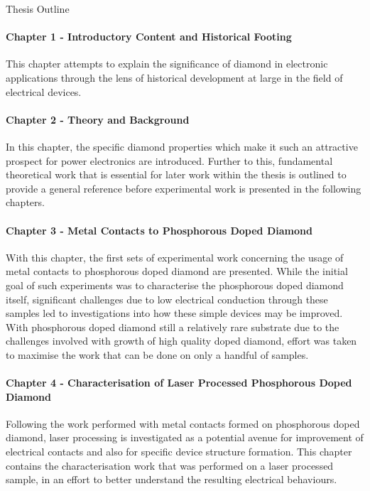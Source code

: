 \begin{refsection}
\begin{introduction}
\begin{section}{Thesis Outline}
{\paragraph{Chapter 1 - Introductory Content and Historical Footing}
This chapter attempts to explain the significance of diamond in electronic applications through the lens of historical development at large in the field of electrical devices. 

\paragraph{Chapter 2 - Theory and Background}
In this chapter, the specific diamond properties which make it such an attractive prospect for power electronics are introduced. Further to this, fundamental theoretical work that is essential for later work within the thesis is outlined to provide a general reference before experimental work is presented in the following chapters.

\paragraph{Chapter 3 - Metal Contacts to Phosphorous Doped Diamond}
With this chapter, the first sets of experimental work concerning the usage of metal contacts to phosphorous doped diamond are presented. While the initial goal of such experiments was to characterise the phosphorous doped diamond itself, significant challenges due to low electrical conduction through these samples led to investigations into how these simple devices may be improved. With phosphorous doped diamond still a relatively rare substrate due to the challenges involved with growth of high quality doped diamond, effort was taken to maximise the work that can be done on only a handful of samples.

\paragraph{Chapter 4 - Characterisation of Laser Processed Phosphorous Doped Diamond}
Following the work performed with metal contacts formed on phosphorous doped diamond, laser processing is investigated as a potential avenue for improvement of electrical contacts and also for specific device structure formation. This chapter contains the characterisation work that was performed on a laser processed sample, in an effort to better understand the resulting electrical behaviours.

}
\end{section}
\end{introduction}
\end{refsection}
